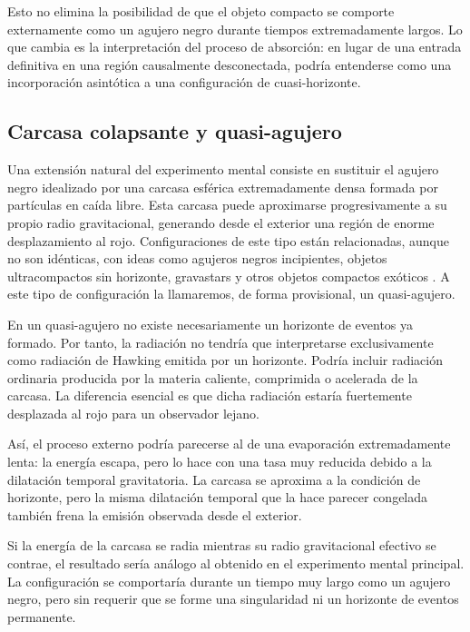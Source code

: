 \documentclass[
aps,
prd,
reprint,
superscriptaddress,
nofootinbib,
amsmath,
amssymb
]{revtex4-2}
\begin{document}
Esto no elimina la posibilidad de que el objeto compacto se comporte externamente como un agujero negro durante tiempos extremadamente largos. Lo que cambia es la interpretación del proceso de absorción: en lugar de una entrada definitiva en una región causalmente desconectada, podría entenderse como una incorporación asintótica a una configuración de cuasi-horizonte.

\subsection{Carcasa colapsante y quasi-agujero}

Una extensión natural del experimento mental consiste en sustituir el agujero negro idealizado por una carcasa esférica extremadamente densa formada por partículas en caída libre. Esta carcasa puede aproximarse progresivamente a su propio radio gravitacional, generando desde el exterior una región de enorme desplazamiento al rojo. Configuraciones de este tipo están relacionadas, aunque no son idénticas, con ideas como agujeros negros incipientes, objetos ultracompactos sin horizonte, gravastars y otros objetos compactos exóticos \cite{Vachaspati2007,Barcelo2008,MazurMottola2004,CardosoPani2019}. A este tipo de configuración la llamaremos, de forma provisional, un quasi-agujero.

En un quasi-agujero no existe necesariamente un horizonte de eventos ya formado. Por tanto, la radiación no tendría que interpretarse exclusivamente como radiación de Hawking emitida por un horizonte. Podría incluir radiación ordinaria producida por la materia caliente, comprimida o acelerada de la carcasa. La diferencia esencial es que dicha radiación estaría fuertemente desplazada al rojo para un observador lejano.

Así, el proceso externo podría parecerse al de una evaporación extremadamente lenta: la energía escapa, pero lo hace con una tasa muy reducida debido a la dilatación temporal gravitatoria. La carcasa se aproxima a la condición de horizonte, pero la misma dilatación temporal que la hace parecer congelada también frena la emisión observada desde el exterior.

Si la energía de la carcasa se radia mientras su radio gravitacional efectivo se contrae, el resultado sería análogo al obtenido en el experimento mental principal. La configuración se comportaría durante un tiempo muy largo como un agujero negro, pero sin requerir que se forme una singularidad ni un horizonte de eventos permanente.
\end{document}
